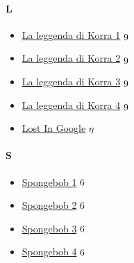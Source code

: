 	\paragraph{L} \hypertarget{SL}{}
		\begin{itemize}
			
			\item \href{https://mega.nz/#F!HDYyxSKb!JcmYwCalMyQovYdUme0YmA} {La leggenda di Korra 1}  $\oldstylenums{9}$ \\ 
			\item \href{https://mega.nz/#F!HHI2lISI!jBuAonadtbn_8o6jeJrNew} {La leggenda di Korra 2}  $\oldstylenums{9}$ \\ 
			\item \href{https://mega.nz/#F!WDIG2KAK!1emiM1Dk3BubG8JVl6stZg} {La leggenda di Korra 3}  $\oldstylenums{9}$ \\ 
			\item \href{https://mega.nz/#F!7WQC2AJK!iXMQVSNUmRh6rXv4yaMI3w} {La leggenda di Korra 4}  $\oldstylenums{9}$ \\ 
			\item \href{https://mega.nz/#F!wItTBAxJ!vS_UjazQm3piF2Y15ZVHiQ} {Lost In Google}  $\eta$ \\ 
			
			
		\end{itemize}
	
	\paragraph{S} \hypertarget{SS}{}
		\begin{itemize}
			
			\item \href{https://mega.nz/#F!mbYD3CBS!P4lO-NwDipYFObv1xH2UfA} {Spongebob 1}  $\oldstylenums{6}$ \\
			\item \href{https://mega.nz/#F!SGh12SDQ!ttAab6MAzj6tQ-ZUUeYBsg} {Spongebob 2}  $\oldstylenums{6}$ \\ 
			\item \href{https://mega.nz/#F!TbQVXQZB!XpVZ2H2_uKgSyBS1n8Z0jg} {Spongebob 3}  $\oldstylenums{6}$ \\
			\item \href{https://mega.nz/#F!7WIxCYRa!KEneAgBkQEvmvyuGxivQ3A} {Spongebob 4}  $\oldstylenums{6}$ \\
			
		\end{itemize}
	
